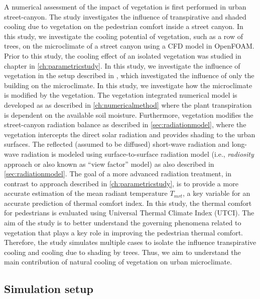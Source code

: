 A numerical assessment of the impact of vegetation is first performed in urban street-canyon. The study investigates the influence of transpirative and shaded cooling due to vegetation on the pedestrian comfort inside a street canyon. In this study, we investigate the cooling potential of vegetation, such as a row of trees, on the microclimate of a street canyon using a CFD model in OpenFOAM. Prior to this study, the cooling effect of an isolated vegetation was studied in chapter in \cref{ch:parametricstudy}. In this study, we investigate the influence of vegetation in the setup described in \cite{Kubilay2018}, which investigated the influence of only the building on the microclimate. In this study,  we investigate how the microclimate is modified by the vegetation. The vegetation integrated numerical model is developed as as described in \cref{ch:numericalmethod} where the plant transpiration is dependent on the available soil moisture. Furthermore, vegetation modifies the street-canyon radiation balance as described in \cref{sec:radiationmodel}, where the vegetation intercepts the direct solar radiation and provides shading to the urban surfaces. The reflected (assumed to be diffused) short-wave radiation and long-wave radiation is modeled using surface-to-surface radiation model (i.e.,  \textit{radiosity} approach or also known as ``view factor'' model) as also described in  \cref{sec:radiationmodel}. The goal of a more advanced radiation treatment, in contrast to approach described in \cref{ch:parametricstudy}, is to provide a more accurate estimation of the mean radiant temperature $T_{\textit{mrt}}$, a key variable for an accurate prediction of thermal comfort index. In this study, the thermal comfort for pedestrians is evaluated using Universal Thermal Climate Index (UTCI). The aim of the study is to better understand the governing phenomena related to vegetation that plays a key role in improving the pedestrian thermal comfort. Therefore, the study simulates multiple cases to isolate the influence transpirative cooling and cooling due to shading by trees. Thus, we aim to understand the main contribution of natural cooling of vegetation on urban microclimate.  

\subsection{Simulation setup}

